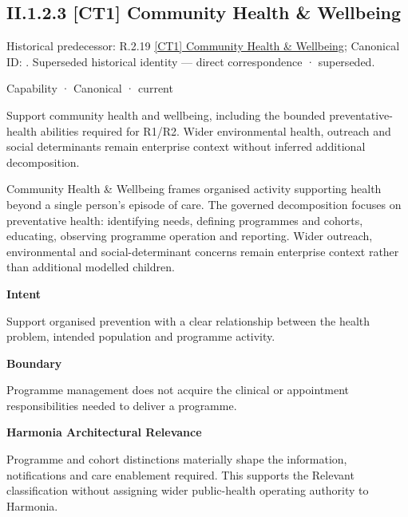 \subsection*{II.1.2.3 [CT1] Community Health \& Wellbeing}
\label{navigation:II.1.2.3}

{\small Historical predecessor: R.2.19 \hyperref[element:175174c5cce549d2b154a4f6704721dc]{[CT1] Community Health \& Wellbeing}; Canonical ID: \texttt{}. Superseded historical identity — direct correspondence · superseded.}\par
\label{element:b326b4aaf02a41a986ed22d184cbc152}
{\small Capability · Canonical · current}\par

Support community health and wellbeing, including the bounded preventative-health abilities required for R1/R2. Wider environmental health, outreach and social determinants remain enterprise context without inferred additional decomposition.



Community Health \& Wellbeing frames organised activity supporting health beyond a single person's episode of care. The governed decomposition focuses on preventative health: identifying needs, defining programmes and cohorts, educating, observing programme operation and reporting. Wider outreach, environmental and social-determinant concerns remain enterprise context rather than additional modelled children.



\textbf{Intent}



Support organised prevention with a clear relationship between the health problem, intended population and programme activity.



\textbf{Boundary}



Programme management does not acquire the clinical or appointment responsibilities needed to deliver a programme.



\textbf{Harmonia Architectural Relevance}



Programme and cohort distinctions materially shape the information, notifications and care enablement required. This supports the Relevant classification without assigning wider public-health operating authority to Harmonia.


